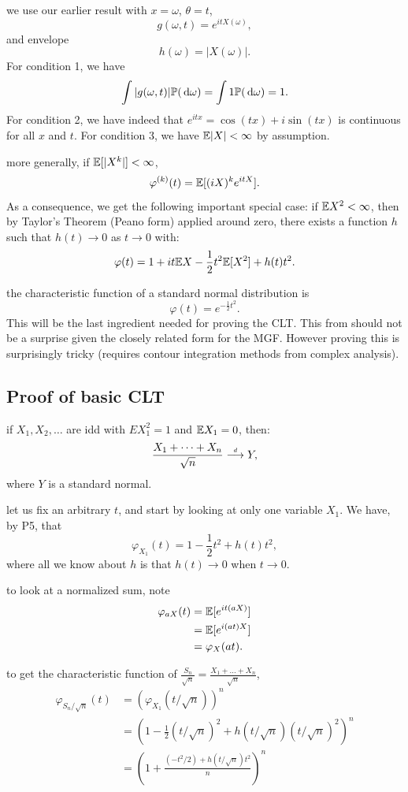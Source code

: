 \documentclass{article}
\begin{document}
 we use our earlier result with $x = \omega$,  $\theta = t$, 
\[ g(\omega, t) = e^{itX(\omega)}, \]
and envelope
\[ h(\omega) = |X(\omega)|. \]
For condition 1, we have
\[ \int | g(\omega, t) | {\mathbb P}(\,\mathrm{d} \omega) = \int 1 {\mathbb P}(\,\mathrm{d} \omega) = 1. \]
For condition 2, we have indeed that $e^{itx} = \cos(tx) + i \sin(tx)$ is continuous for all $x$ and $t$. 
For condition 3, we have ${\mathbb E}|X| < \infty$ by assumption.

 more generally, if ${\mathbb E}[|X^k|] < \infty$, 
\[ \varphi^{(k)}(t) = {\mathbb E}[(iX)^k e^{itX}]. \]
As a consequence, we get the following important special case: if ${\mathbb E} X^2 < \infty$, then by Taylor's Theorem (Peano form) applied around zero, there exists a function $h$ such that $h(t) \to 0$ as $t\to 0$ with:
\[ \varphi(t) = 1 + it{\mathbb E} X - \frac{1}{2} t^2 {\mathbb E}[X^2] + h(t) t^2. \]

 the characteristic function of a standard normal distribution is 
\[ \varphi(t) = e^{-\frac{1}{2} t^2}. \]
This will be the last ingredient needed for proving the CLT. This from should not be a surprise given the closely related form for the MGF. However proving this is surprisingly tricky (requires contour integration methods from complex analysis). 


\subsection{Proof of basic CLT}

 if $X_1, X_2, \dots$ are idd with $E X_1^2 = 1$ and ${\mathbb E} X_1 = 0$, then:
\[ \frac{X_1 + \dots + X_n}{\sqrt{n}} \stackrel{\scriptscriptstyle d}{\longrightarrow} Y, \]
where $Y$ is a standard normal. 

 let us fix an arbitrary $t$, and start by looking at only one variable $X_1$. We have, by P5, that 
\[ \varphi_{X_1}(t) = 1 - \frac{1}{2} t^2 + h(t) t^2, \]
where all we know about $h$ is that $h(t) \to 0$ when $t \to 0$.

 to look at a normalized sum, note
\begin{align*}
\varphi_{aX}(t) &= {\mathbb E}[ e^{it(aX)}] \\
&= {\mathbb E}[ e^{i (at) X} ] \\
&= \varphi_{X}(at).
\end{align*}

 to get the characteristic function of $\frac{S_n}{\sqrt{n}} = \frac{X_1 + \dots + X_n}{\sqrt{n}}$,
\begin{align*}
\varphi_{S_n/\sqrt{n}}(t) &= ( \varphi_{X_1}(t/\sqrt{n}))^n \\
&= \left(1 - \frac{1}{2} (t/\sqrt{n})^2 + h(t/\sqrt{n}) (t/\sqrt{n})^2\right)^n \\
&= \left(1 + \frac{(-t^2/2) + h(t/\sqrt{n}) t^2}{n} \right)^n
\end{align*}
\end{document}

